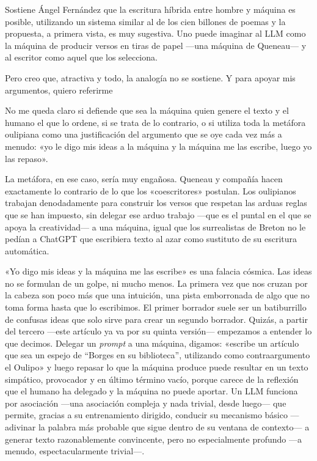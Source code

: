 \documentclass[11pt,a4paper]{article}
\begin{document}
Sostiene Ángel Fernández que la escritura híbrida entre hombre y máquina es posible, utilizando un sistema similar al de los cien billones de poemas y la propuesta, a primera vista, es muy sugestiva. Uno puede imaginar al LLM como la máquina de producir versos en tiras de papel ---una máquina de Queneau--- y al escritor como aquel que los selecciona. 

Pero creo que, atractiva y todo, la analogía no se sostiene. Y para apoyar mis argumentos, quiero referirme 

No me queda claro si defiende que sea la máquina quien genere el texto y el humano el que lo ordene, si se trata de lo contrario, o si utiliza toda la metáfora oulipiana como una justificación del argumento que se oye cada vez más a menudo: «yo le digo mis ideas a la máquina y la máquina me las escribe, luego yo las repaso».

La metáfora, en ese caso, sería muy engañosa. Queneau y compañía hacen exactamente lo contrario de lo que los «coescritores» postulan. Los oulipianos trabajan denodadamente para construir los versos que respetan las arduas reglas que se han impuesto, sin delegar ese arduo trabajo ---que es el puntal en el que se apoya la creatividad--- a una máquina, igual que los surrealistas de Breton no le pedían a ChatGPT que escribiera texto al azar como sustituto de su escritura automática.

«Yo digo mis ideas y la máquina me las escribe» es una falacia cósmica. Las ideas no se formulan de un golpe, ni mucho menos. La primera vez que nos cruzan por la cabeza son poco más que una intuición, una pista emborronada de algo que no toma forma hasta que lo escribimos. El primer borrador suele ser un batiburrillo de confusas ideas que solo sirve para crear un segundo borrador. Quizás, a partir del tercero ---este artículo ya va por su quinta versión--- empezamos a entender lo que decimos. Delegar un \emph{prompt} a una máquina, digamos: «escribe un artículo que sea un espejo de “Borges en su biblioteca”, utilizando como contraargumento el Oulipo» y luego repasar lo que la máquina produce puede resultar en un texto simpático, provocador y en último término vacío, porque carece de la reflexión que el humano ha delegado y la máquina no puede aportar. Un LLM funciona por asociación ---una asociación compleja y nada trivial, desde luego--- que permite, gracias a su entrenamiento dirigido, conducir su mecanismo básico ---adivinar la palabra más probable que sigue dentro de su ventana de contexto--- a generar texto razonablemente convincente, pero no especialmente profundo ---a menudo, espectacularmente trivial---.
\end{document}
